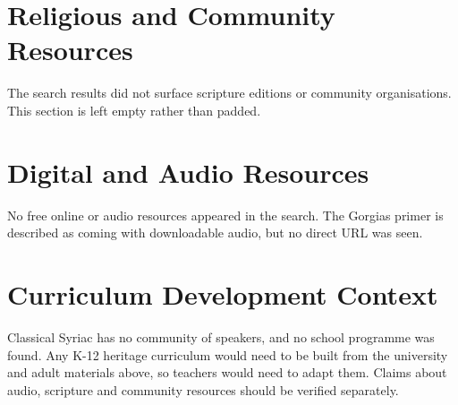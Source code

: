 \documentclass[12pt]{article}
\begin{document}
\section{Religious and Community Resources}
The search results did not surface scripture editions or community organisations. This section is left empty rather than padded.

\section{Digital and Audio Resources}
No free online or audio resources appeared in the search. The Gorgias primer is described as coming with downloadable audio, but no direct URL was seen.

\section{Curriculum Development Context}
Classical Syriac has no community of speakers, and no school programme was found. Any K-12 heritage curriculum would need to be built from the university and adult materials above, so teachers would need to adapt them. Claims about audio, scripture and community resources should be verified separately.
\end{document}
